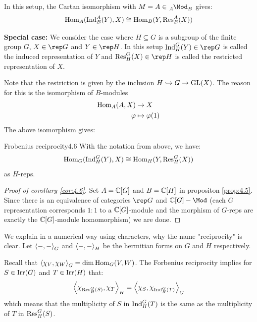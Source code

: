 \documentclass[twoside = false,	%
		headsepline,		%
		parskip = true,
		]{scrbook}						%
\begin{document}
        In this setup, the Cartan isomorphism with $M = A \in \tensor[_A]{\Mod}{_B}$ gives:
        \begin{equation*}
            \mathrm{Hom}_A(\mathrm{Ind}_B^A(Y),X) \cong \mathrm{Hom}_B(Y,\mathrm{Res}_B^A(X))
        \end{equation*}

    \textbf{Special case:}
        We consider the case where $H \subseteq G$ is a subgroup of the finite group $G$, $X \in \rep G$ and $Y \in \rep H$. In this setup $\Ind_H^G(Y) \in \rep G$ is called the induced representation of $Y$ and $\Res_H^G(X) \in \rep H$ is called the restricted representation of $X$.

        Note that the restriction is given by the inclusion $H \hookrightarrow G \to \mathrm{GL}(X)$. The reason for this is the isomorphism of $B$-modules
        \begin{equation*}
        \begin{split}
            \mathrm{Hom}_A(A,X) &\to X \\
            \varphi &\mapsto \varphi(1)
        \end{split}
        \end{equation*}
        The above isomorphism gives:
        \begin{corollary}{Frobenius reciprocity}{4.6}
            With the notation from above, we have:
            \begin{equation*}
                \mathrm{Hom}_G(\mathrm{Ind}_H^G(Y),X) \cong \mathrm{Hom}_H(Y,\mathrm{Res}_H^G(X))
            \end{equation*}
            as $H$-reps.
        \end{corollary}

        \begin{proof}[Proof of corollary \ref{cor:4.6}]
            Set $A = \mathbb C[G]$ and $B = \mathbb C[H]$ in propositon \ref{prop:4.5}. Since there is an equivalence of categories $\rep G$ and $ \C[G]-\Mod$ (each $G$ representation corresponds $1:1$ to a $\mathbb C[G]$-module and the morphism of $G$-reps are exactly the $\mathbb C[G]$-module homomorphism) we are done.
        \end{proof}

        We explain in a numerical way using characters, why the name "reciprocity" is clear. Let $\left\langle -,-\right\rangle_G$ and $\left\langle -,-\right\rangle_H$ be the hermitian forms on $G$ and $H$ respectively.
        
        Recall that $\left\langle \chi_V,\chi_W\right\rangle_G = \dim \mathrm{Hom}_G(V,W)$. The Forbenius reciprocity implies for $S \in \mathrm{Irr}(G)$ and $T \in \mathrm{Irr}(H)$ that:
        \begin{equation*}
            \left\langle \chi_{\mathrm{Res}_H^G(S)},\chi_T\right\rangle_H = \left\langle \chi_S,\chi_{\mathrm{Ind}_H^G(T)}\right\rangle_G
        \end{equation*}
        which means that the multiplicity of $S$ in $\mathrm{Ind}_H^G(T)$ is the same as the multiplicity of $T$ in $\mathrm{Res}_H^G(S)$.
\end{document}
